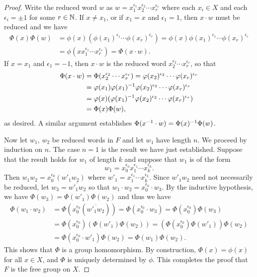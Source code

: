 \begin{proof}
    Write the reduced word \(w\) as \(w = x_1^{\epsilon_1} x_2^{\epsilon_2}
    \cdots x_r ^{\epsilon_r}\) where each \(x_i \in X\) and each \(\epsilon_i =
    \pm 1\) for some \(r \in \mathbb{N}\). If \(x \neq x_1\), or if \(x_1 = x\) and
    \(\epsilon_1 = 1\), then \(x \cdot w\) must be reduced and we have
    \begin{align*}
        \Phi(x)\Phi(w) & = \phi(x)(\phi(x_1)^{\epsilon_1} \cdots \phi(x_r)^{\epsilon_r}) = \phi(x)\phi(x_1)^{\epsilon_1} \cdots \phi(x_r)^{\epsilon_r} \\
                       & = \phi(x x_1^{\epsilon_1} \cdots x_r^{\epsilon_r}) = \Phi(x \cdot w).
    \end{align*}
    If \(x = x_1\) and \(\epsilon_1 = -1\), then  \(x \cdot w\) is the reduced
    word \(x_2^{\epsilon_2} \cdots x_r^{\epsilon_r}\), so that
    \begin{align*}
        \Phi(x \cdot w) & = \Phi(x_2^{\epsilon_2} \cdots x_r^{\epsilon_r}) = \varphi(x_2)^{\epsilon_2} \cdots \varphi(x_r)^{\epsilon_r} \\
            & = \varphi(x_1)\varphi(x_1)^{-1}\varphi(x_2)^{\epsilon_2} \cdots \varphi(x_r)^{\epsilon_r} \\ &= \varphi(x)(\varphi(x_1)^{-1}\varphi(x_2)^{\epsilon_2} \cdots \varphi(x_r)^{\epsilon_r}) \\
            & = \Phi(x)\Phi(w),
    \end{align*}
    as desired. A similar argument establishes \(\Phi(x^{-1} \cdot w) =
    \Phi(x)^{-1}\Phi(w)\).

    Now let \(w_1\), \(w_2\) be reduced words in \(F\) and let \(w_1\) have
    length \(n\). We proceed by induction on \(n\). The case \(n = 1\) is the
    result we have just established. Suppose that the result holds for \(w_1\)
    of length \(k\) and suppose that \(w_1\) is of the form
    \[
        w_1 = x_0^{\epsilon_0} x_1^{\epsilon_1} \cdots x_k^{\epsilon_k}.
    \]
    Then \(w_1w_2 = x_0^{\epsilon_0} (w'_1 w_2)\) where \(w'_1 =
    x_1^{\epsilon_1} \cdots x_k^{\epsilon_k}\). Since \(w'_1w_2\) need not
    necessarily be reduced, let \(w_3 = \overline{w'_1 w_2}\) so that \(w_1
    \cdot w_2 = x_0^{\epsilon_0} \cdot w_3\). By the inductive hypothesis, we
    have \(\Phi(w_3) = \Phi(w'_1) \Phi(w_2)\) and thus we have
    \begin{align*}
        \Phi(w_1 \cdot w_2) & = \Phi(x_0^{\epsilon_0}(\overline{w'_1 w_2})) = \Phi(x_0^{\epsilon_0} \cdot w_3) = \Phi(x_0^{\epsilon_0}) \Phi(w_3) \\
                            & = \Phi(x_0^{\epsilon_0})\left(\Phi(w'_1) \Phi(w_2)\right) = \left(\Phi(x_0^{\epsilon_0}) \Phi(w'_1)\right) \Phi(w_2) \\
                            & = \Phi(x_0^{\epsilon_0} \cdot w'_1) \Phi(w_2) = \Phi(w_1) \Phi(w_2).
    \end{align*}
    This shows that \(\Phi\) is a group homomorphism. By construction, \(\Phi(x)
    = \phi(x)\) for all \(x \in X\), and \(\Phi\) is uniquely determined by
    \(\phi\). This completes the proof that \(F\) is the free group on \(X\).
\end{proof}

